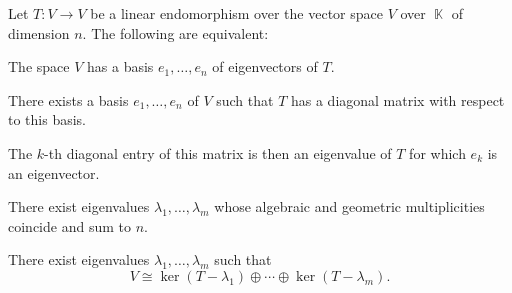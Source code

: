 \begin{proposition}\label{thm:operator_diagonalizability}
  Let \( T: V \to V \) be a linear endomorphism over the vector space \( V \) over \( \BbbK \) of dimension \( n \). The following are equivalent:
  \begin{thmenum}
     The space \( V \) has a basis \( e_1, \ldots, e_n \) of eigenvectors of \( T \).

     There exists a basis \( e_1, \ldots, e_n \) of \( V \) such that \( T \) has a diagonal matrix with respect to this basis.

    The \( k \)-th diagonal entry of this matrix is then an eigenvalue of \( T \) for which \( e_k \) is an eigenvector.

     There exist eigenvalues \( \lambda_1, \ldots, \lambda_m \) whose algebraic and geometric multiplicities coincide and sum to \( n \).

     There exist eigenvalues \( \lambda_1, \ldots, \lambda_m \) such that
    \begin{equation*}
      V \cong \ker(T - \lambda_1) \oplus \cdots \oplus \ker(T - \lambda_m).
    \end{equation*}
  \end{thmenum}
\end{proposition}
